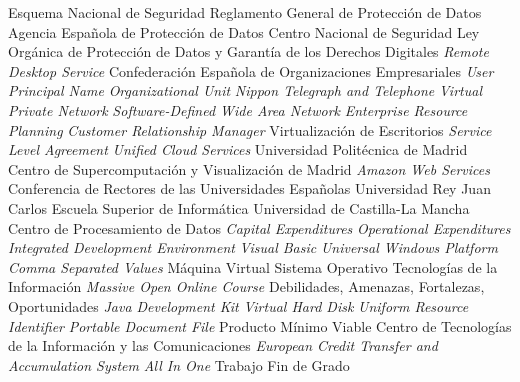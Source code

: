 {\begin{acronym}[XXXXXXXX]
       {Esquema Nacional de Seguridad}
      {Reglamento General de Protección de Datos}
      {Agencia Española de Protección de Datos}
       {Centro Nacional de Seguridad}
   {Ley Orgánica de Protección de Datos y Garantía de los Derechos Digitales}
       {\textit{Remote Desktop Service}}
      {Confederación Española de Organizaciones Empresariales}
       {\textit{User Principal Name}}
        {\textit{Organizational Unit}}
       {\textit{Nippon Telegraph and Telephone}}
       {\textit{Virtual Private Network}}
    {\textit{Software-Defined Wide Area Network}}
       {\textit{Enterprise Resource Planning}}
       {\textit{Customer Relationship Manager}}
       {Virtualización de Escritorios}
       {\textit{Service Level Agreement}}
       {\textit{Unified Cloud Services}}
       {Universidad Politécnica de Madrid}
   {Centro de Supercomputación y Visualización de Madrid}
       {\textit{Amazon Web Services}}
      {Conferencia de Rectores de las Universidades Españolas}
      {Universidad Rey Juan Carlos}
       {Escuela Superior de Informática}
      {Universidad de Castilla-La Mancha}
       {Centro de Procesamiento de Datos}
     {\textit{Capital Expenditures}}
      {\textit{Operational Expenditures}}
       {\textit{Integrated Development Environment}}
        {\textit{Visual Basic}}
       {\textit{Universal Windows Platform}}
       {\textit{Comma Separated Values}}
        {Máquina Virtual}
        {Sistema Operativo}
        {Tecnologías de la Información}
      {\textit{Massive Open Online Course}}
      {Debilidades, Amenazas, Fortalezas, Oportunidades}
       {\textit{Java Development Kit}}
       {\textit{Virtual Hard Disk}}
       {\textit{Uniform Resource Identifier}}
       {\textit{Portable Document File}}
       {Producto Mínimo Viable}
      {Centro de Tecnologías de la Información y las Comunicaciones}
      {\textit{European Credit Transfer and Accumulation System}}
       {\textit{All In One}}
       {Trabajo Fin de Grado}
\end{acronym}
}




